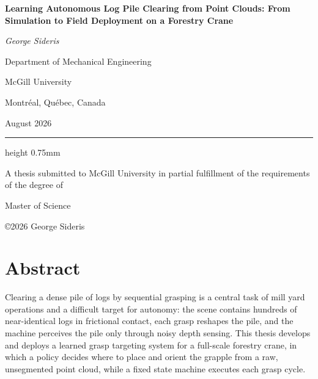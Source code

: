 \documentclass[12pt, letterpaper]{report}
\author{\textcopyright George Sideris, 2026}
\date{}
\renewcommand{\chaptermark}[1]{\markboth{#1}{}}
\begin{document}
\begin{titlepage}
	\begin{center}
		\vspace*{2.5cm}

		\LARGE
		\textbf{Learning Autonomous Log Pile Clearing from Point Clouds: From Simulation to Field Deployment on a Forestry Crane}

		\vspace{1.2cm}

		\Large
		\textit{George Sideris}

		\vspace{2cm}

		\Large
		Department of Mechanical Engineering

		\vspace{-5mm}
		McGill University

		\vspace{-5mm}
		Montr\'eal, Qu\'ebec, Canada

		\vspace{2.5cm}
		August 2026

		\vspace{1cm}
		{\color{red} \hrule height 0.75mm}

		\vspace{0.4cm}

		\small
		A thesis submitted to McGill University in partial fulfillment of the
		requirements of the degree of

		Master of Science

		\copyright\hspace{0.5mm}2026 George Sideris

	\end{center}
\end{titlepage}

\renewcommand{\chaptermark}[1]{\markboth{\thechapter.\ #1}{}}

\chapter*{Abstract}
\label{chap:engAbstract}

Clearing a dense pile of logs by sequential grasping is a central task of
mill yard operations and a difficult target for autonomy: the scene contains
hundreds of near-identical logs in frictional contact, each grasp reshapes
the pile, and the machine perceives the pile only through noisy depth
sensing. This thesis develops and deploys a learned grasp targeting system
for a full-scale forestry crane, in which a policy decides where to place and
orient the grapple from a raw, unsegmented point cloud, while a fixed state
machine executes each grasp cycle.
\end{document}
